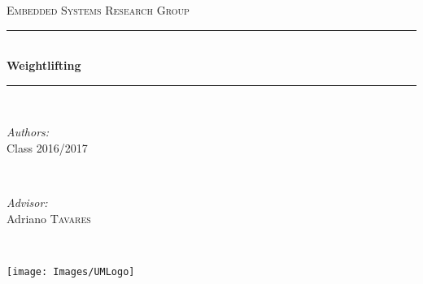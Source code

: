\documentclass[12pt]{article}
\begin{document}
\begin{titlepage}
\newcommand{\HRule}{\rule{\linewidth}{0.5mm}} %
\center %


\textsc{\large Embedded Systems Research Group}\\[0.5cm] %


\HRule \\[1.2cm]
{ \Huge \bfseries 
Weightlifting}\\[1.0cm] %
\HRule \\[3.0cm]
 
\begin{minipage}{0.4\textwidth}
\begin{flushleft} \large
\emph{Authors:}\\
Class 2016/2017   \\
\end{flushleft}
\end{minipage}
~
\begin{minipage}{0.4\textwidth}
\begin{flushright} \large
 \emph{Advisor:} \\
Adriano \textsc{Tavares} \\ %
\end{flushright}
\end{minipage}\\[2cm]

\noindent\begin{minipage}{0.2\textwidth}
\texttt{[image: Images/UMLogo]}\\ [0.5cm] 
\end{minipage}%
\hfill%




\end{titlepage}
\end{document}
